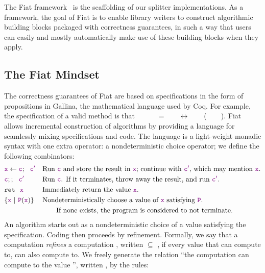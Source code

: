   The Fiat framework~\cite{fiat} is the scaffolding of our splitter implementations.  As a framework, the goal of Fiat is to enable library writers to construct algorithmic building blocks packaged with correctness guarantees, in such a way that users can easily and mostly automatically make use of these building blocks when they apply. 
  
  \subsection{The Fiat Mindset}
    The correctness guarantees of Fiat are based on specifications in the form of propositions in Gallina, the mathematical language used by Coq.  For example, the specification of a valid  method is that ~~~~~~=~~\true~~\allowbreak$\longleftrightarrow$\allowbreak~~~~(~~~~).  Fiat allows incremental construction of algorithms by providing a language for seamlessly mixing specifications and code.  The language is a light-weight monadic syntax with one extra operator: a nondeterministic choice operator; we define the following combinators:
    \begin{align*}
      &\textcolor{violet}{\texttt{x}} \leftarrow \textcolor{violet}{\texttt{c}};~~\textcolor{violet}{\texttt{c$'$}} && \text{Run \textcolor{violet}{\texttt{c}} and store the result in \textcolor{violet}{\texttt{x}}; continue with \textcolor{violet}{\texttt{c$'$}}, which may mention \textcolor{violet}{\texttt{x}}.} \\
      &\textcolor{violet}{\texttt{c}};;~~\textcolor{violet}{\texttt{c$'$}}&&\text{Run \textcolor{violet}{\texttt{c}}.  If it terminates, throw away the result, and run \textcolor{violet}{\texttt{c$'$}}.} \\
      &\texttt{ret}~~\textcolor{violet}{\texttt{x}} && \text{Immediately return the value \textcolor{violet}{\texttt{x}}.} \\
      &\{ \textcolor{violet}{\texttt{x}}~|~\textcolor{violet}{\texttt{P}}(\textcolor{violet}{\texttt{x}}) \}&&\text{Nondeterministically choose a value of \textcolor{violet}{\texttt{x}} satisfying \textcolor{violet}{\texttt{P}}.} \\
      &&&\qquad\text{If none exists, the program is considered to not terminate.}
    \end{align*}
    An algorithm starts out as a nondeterministic choice of a value satisfying the specification.  Coding then proceeds by refinement.  Formally, we say that a computation  \emph{refines} a computation , written  $\subseteq$ , if every value that  can compute to,  can also compute to.  We freely generate the relation ``the computation  can compute to the value '', written , by the rules:
